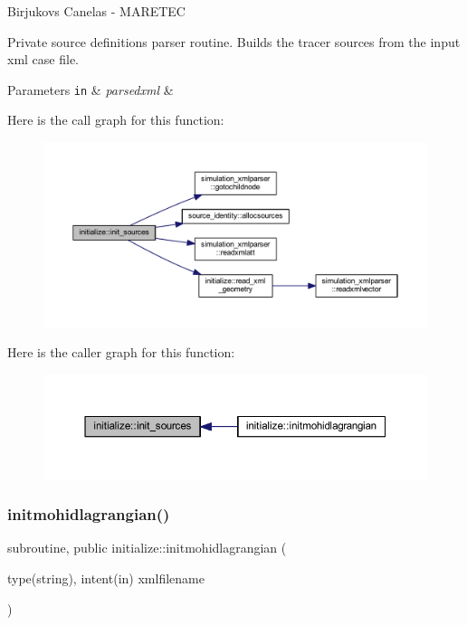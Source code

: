 Birjukovs Canelas -\/ M\+A\+R\+E\+T\+EC 

Private source definitions parser routine. Builds the tracer sources from the input xml case file. 
\begin{DoxyParams}[1]{Parameters}
\mbox{\tt in}  & {\em parsedxml} & \\
\hline
\end{DoxyParams}
Here is the call graph for this function\+:\nopagebreak
\begin{figure}[H]
\begin{center}
\leavevmode
\includegraphics[width=350pt]{namespaceinitialize_a9ed75476e5dd07928aed3442281930be_cgraph}
\end{center}
\end{figure}
Here is the caller graph for this function\+:\nopagebreak
\begin{figure}[H]
\begin{center}
\leavevmode
\includegraphics[width=350pt]{namespaceinitialize_a9ed75476e5dd07928aed3442281930be_icgraph}
\end{center}
\end{figure}
\mbox{\label{namespaceinitialize_a45b7ca20c45cf272acbc391950cbb804}} 
\subsubsection{\texorpdfstring{initmohidlagrangian()}{initmohidlagrangian()}}
{\footnotesize\ttfamily subroutine, public initialize\+::initmohidlagrangian (\begin{DoxyParamCaption}\item[{type(string), intent(in)}]{xmlfilename }\end{DoxyParamCaption})}




